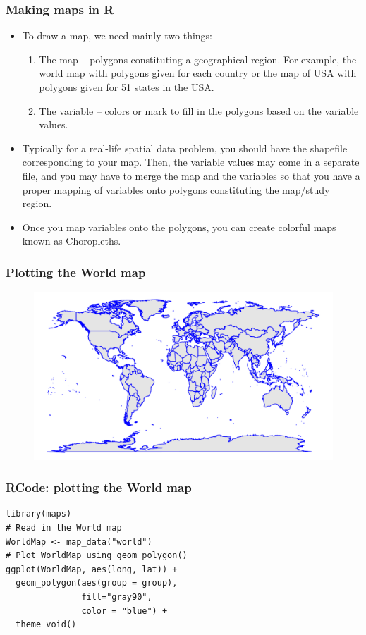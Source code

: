 \documentclass{beamer}
\begin{document}
\begin{frame}\frametitle{Making maps in R}
\begin{itemize}
\item To draw a map, we need mainly two things:
\begin{enumerate}
\item The map -- polygons constituting a geographical region. For example, the world map with polygons given for each country or the map of USA with polygons given for 51 states in the USA. 
\item The variable -- colors or mark to fill in the polygons based on the variable values.
\end{enumerate}
\item<2->Typically for a real-life spatial data problem, you should have the shapefile corresponding to your map. Then, the variable values may come in a separate file, and you may have to merge the map and the variables so that you have a proper mapping of variables onto polygons constituting the map/study region.
\item<3-> Once you map variables onto the polygons, you can create colorful maps known as Choropleths.
\end{itemize}
\end{frame}

\begin{frame}\frametitle{Plotting the World map}
\begin{figure}
\includegraphics[width=0.99\linewidth]{PlotsLec4/WorldMap}
\end{figure}
\end{frame}

\begin{frame}[fragile]\frametitle{RCode: plotting the World map}
\begin{lstlisting}
library(maps)
# Read in the World map
WorldMap <- map_data("world")
# Plot WorldMap using geom_polygon()
ggplot(WorldMap, aes(long, lat)) +
  geom_polygon(aes(group = group),
               fill="gray90",
               color = "blue") +
  theme_void() 
\end{lstlisting}
\end{frame}
\end{document}
